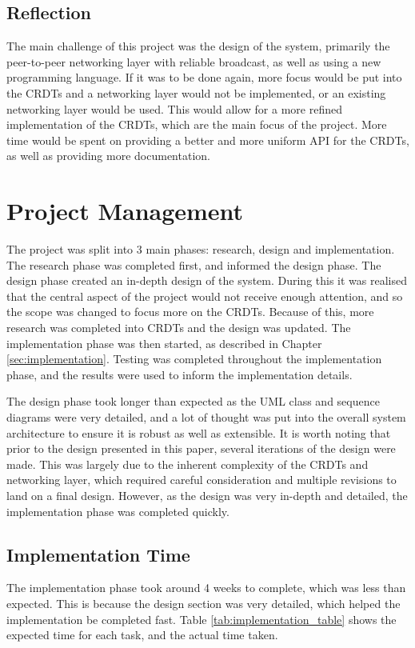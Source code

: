 \documentclass[12pt]{report}
\begin{document}
\section{Reflection}
The main challenge of this project was the design of the system, primarily the peer-to-peer networking layer with reliable broadcast, as well as using a new programming language. If it was to be done again, more focus would be put into the CRDTs and a networking layer would not be implemented, or an existing networking layer would be used. This would allow for a more refined implementation of the CRDTs, which are the main focus of the project. More time would be spent on providing a better and more uniform API for the CRDTs, as well as providing more documentation. \par


\chapter{Project Management}
The project was split into 3 main phases: research, design and implementation. The research phase was completed first, and informed the design phase. The design phase created an in-depth design of the system. During this it was realised that the central aspect of the project would not receive enough attention, and so the scope was changed to focus more on the CRDTs. Because of this, more research was completed into CRDTs and the design was updated. The implementation phase was then started, as described in Chapter \ref{sec:implementation}. Testing was completed throughout the implementation phase, and the results were used to inform the implementation details. \par

The design phase took longer than expected as the UML class and sequence diagrams were very detailed, and a lot of thought was put into the overall system architecture to ensure it is robust as well as extensible. It is worth noting that prior to the design presented in this paper, several iterations of the design were made. This was largely due to the inherent complexity of the CRDTs and networking layer, which required careful consideration and multiple revisions to land on a final design. However, as the design was very in-depth and detailed, the implementation phase was completed quickly. \par

\section{Implementation Time}
The implementation phase took around 4 weeks to complete, which was less than expected. This is because the design section was very detailed, which helped the implementation be completed fast. Table \ref{tab:implementation_table} shows the expected time for each task, and the actual time taken. \par
\end{document}
